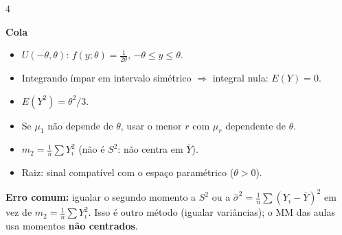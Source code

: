 \documentclass[8pt]{extarticle}
\newcommand{\erro}[1]{\par{\scriptsize\textbf{Erro comum:} #1}\par}
\newenvironment{cola}{\par\vspace{2pt}\noindent\textbf{Cola}\begin{itemize}[leftmargin=*,nosep,label=\textbullet]\scriptsize}{\end{itemize}}
\begin{document}
\begin{multicols*}{4}
\begin{cola}
\item $U(-\theta,\theta)$: $f(y;\theta)=\frac{1}{2\theta}$, $-\theta\le y\le\theta$.
\item Integrando ímpar em intervalo simétrico $\Rightarrow$ integral nula: $E(Y)=0$.
\item $E(Y^2)=\theta^2/3$.
\item Se $\mu_1$ não depende de $\theta$, usar o menor $r$ com $\mu_r$ dependente de $\theta$.
\item $m_2=\frac1n\sum Y_i^2$ (não é $S^2$: não centra em $\bar Y$).
\item Raiz: sinal compatível com o espaço paramétrico ($\theta>0$).
\end{cola}
\erro{igualar o segundo momento a $S^2$ ou a $\hat\sigma^2=\frac1n\sum(Y_i-\bar Y)^2$ em vez de $m_2=\frac1n\sum Y_i^2$. Isso é outro método (igualar variâncias); o MM das aulas usa momentos \textbf{não centrados}.}

\end{multicols*}
\end{document}
